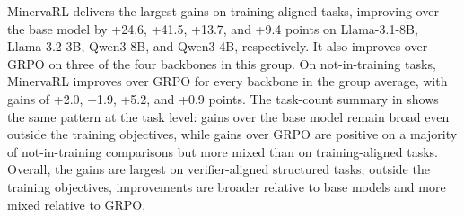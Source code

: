 MinervaRL delivers the largest gains on training-aligned tasks, improving over the base model by +24.6, +41.5, +13.7, and +9.4 points on Llama-3.1-8B, Llama-3.2-3B, Qwen3-8B, and Qwen3-4B, respectively. It also improves over GRPO on three of the four backbones in this group. On not-in-training tasks, MinervaRL improves over GRPO for every backbone in the group average, with gains of +2.0, +1.9, +5.2, and +0.9 points. The task-count summary in  shows the same pattern at the task level: gains over the base model remain broad even outside the training objectives, while gains over GRPO are positive on a majority of not-in-training comparisons but more mixed than on training-aligned tasks. Overall, the gains are largest on verifier-aligned structured tasks; outside the training objectives, improvements are broader relative to base models and more mixed relative to GRPO.
